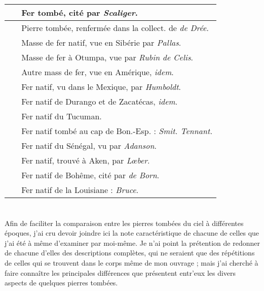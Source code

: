 \documentclass[a4paper, 12pt, oneside, french]{article}
\begin{document}
\subsection{}
\begin{center}
    \begin{longtable}{r l}
    \hline
        ~ & Fer tombé, cité par \emph{Scaliger}.   \\ \hline
        ~ & Pierre tombée, renfermée dans la collect. de \emph{de Drée}.   \\ \hline
        ~ & Masse de fer natif, vue en Sibérie par \emph{Pallas}.   \\ \hline
        ~ & Masse de fer à Otumpa, vue par \emph{Rubin de Celis}.   \\ \hline
        ~ & Autre mass de fer, vue en Amérique, \emph{idem}.   \\ \hline
        ~ & Fer natif, vu dans le Mexique, par \emph{Humboldt}.   \\ \hline
        ~ & Fer natif de Durango et de Zacatécas, \emph{idem}.   \\ \hline
        ~ & Fer natif du Tucuman.   \\ \hline
        ~ & Fer natif tombé au cap de Bon.-Esp. : \emph{Smit. Tennant.} \\ \hline
        ~ & Fer natif du Sénégal, vu par \emph{Adanson}.   \\ \hline
        ~ & Fer natif, trouvé à Aken, par \emph{Lœber}.   \\ \hline
        ~ & Fer natif de Bohême, cité par \emph{de Born}.   \\ \hline
        ~ & Fer natif de la Louisiane : \emph{Bruce}. \\ \hline
    \end{longtable}
\end{center}
\clearpage
\section{}
Afin de faciliter la comparaison entre les pierres tombées du ciel à différentes époques, j'ai cru devoir joindre ici la note caractéristique de chacune de celles que j'ai été à même d'examiner par moi-même. Je n'ai point la prétention de redonner de chacune d'elles des descriptions complètes, qui ne seraient que des répétitions de celles qui se trouvent dans le corps même de mon ouvrage ; mais j'ai cherché à faire connaître les principales différences que présentent entr'eux les divers aspects de quelques pierres tombées.
\end{document}
